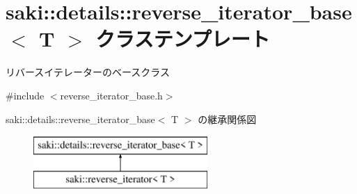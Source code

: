 \hypertarget{classsaki_1_1details_1_1reverse__iterator__base}{}\section{saki\+:\+:details\+:\+:reverse\+\_\+iterator\+\_\+base$<$ T $>$ クラステンプレート}
\label{classsaki_1_1details_1_1reverse__iterator__base}


リバースイテレーターのベースクラス  




{\ttfamily \#include $<$reverse\+\_\+iterator\+\_\+base.\+h$>$}

saki\+:\+:details\+:\+:reverse\+\_\+iterator\+\_\+base$<$ T $>$ の継承関係図\begin{figure}[H]
\begin{center}
\leavevmode
\includegraphics[height=2.000000cm]{classsaki_1_1details_1_1reverse__iterator__base}
\end{center}
\end{figure}
